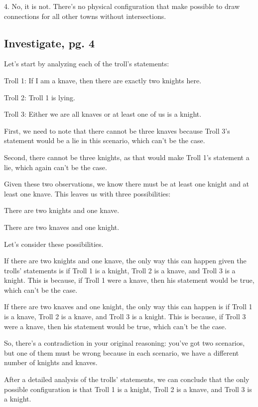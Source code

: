\documentclass{article}
\begin{document}
	4. No, it is not. There's no physical configuration that make possible to draw connections for all other towns without intersections.

	\subsection{Investigate, pg. 4}

  Let's start by analyzing each of the troll's statements:

  Troll 1: If I am a knave, then there are exactly two knights here.

  Troll 2: Troll 1 is lying.

  Troll 3: Either we are all knaves or at least one of us is a knight.
  
  First, we need to note that there cannot be three knaves because Troll 3's statement would be a lie in this scenario, which can't be the case.

  Second, there cannot be three knights, as that would make Troll 1's statement a lie, which again can't be the case.

  Given these two observations, we know there must be at least one knight and at least one knave. This leaves us with three possibilities:

  There are two knights and one knave.

  There are two knaves and one knight.

  Let's consider these possibilities.

  If there are two knights and one knave, the only way this can happen given the trolls' statements is if Troll 1 is a knight, Troll 2 is a knave, and Troll 3 is a knight. This is because, if Troll 1 were a knave, then his statement would be true, which can't be the case.

  If there are two knaves and one knight, the only way this can happen is if Troll 1 is a knave, Troll 2 is a knave, and Troll 3 is a knight. This is because, if Troll 3 were a knave, then his statement would be true, which can't be the case.

  So, there's a contradiction in your original reasoning: you've got two scenarios, but one of them must be wrong because in each scenario, we have a different number of knights and knaves.

  After a detailed analysis of the trolls' statements, we can conclude that the only possible configuration is that Troll 1 is a knight, Troll 2 is a knave, and Troll 3 is a knight.
\end{document}
